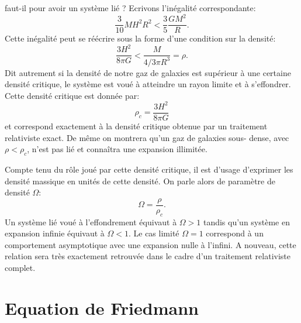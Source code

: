  faut-il pour avoir un système lié ? Ecrivons l'inégalité correspondante:
\begin{equation}
\frac{3}{10} M H^2 R^2 <\frac{3}{5}\frac{GM^2}{R}.
\end{equation}
Cette inégalité peut se réécrire sous la forme d'une condition sur la densité:
\begin{equation}
\frac{3H^2}{8\pi G}< \frac{M}{4/3\pi R^3}=\rho.
\end{equation}
Dit autrement si la densité de notre gaz de galaxies est supérieur à une certaine densité critique, le système est voué à atteindre un rayon limite et à s'effondrer. Cette densité critique  est donnée par:
\begin{equation}
\rho_c =\frac{3H^2}{8\pi G}
\end{equation}
et correspond exactement à la densité critique obtenue par un traitement relativiste exact. De même on montrera qu'un gaz de galaxies sous- dense, avec $\rho< \rho_c$, n'est pas lié et  connaîtra une expansion illimitée. 

Compte tenu du rôle joué par cette densité critique, il est d'usage d'exprimer les densité massique en unités de cette densité. On parle alors de paramètre de densité  $\Omega$:
\begin{equation}
\Omega=\frac{\rho}{\rho_c}.
\end{equation}
Un système lié voué à l'effondrement équivaut à $\Omega>1$ tandis qu'un système en expansion infinie équivaut à $\Omega<1$. Le cas limité $\Omega=1$ correspond à un comportement asymptotique avec une expansion nulle à l'infini. A nouveau, cette relation sera très exactement retrouvée dans le cadre d'un traitement relativiste complet.

\section{Equation de Friedmann}

